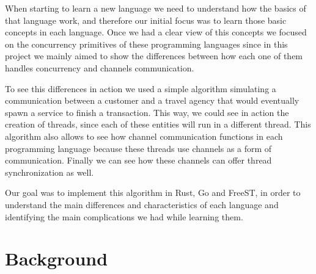 \documentclass[runningheads]{llncs}
\begin{document}
When starting to learn a new language we need to understand how the basics of that language work, and therefore our initial focus was to learn those basic concepts in each language. Once we had a clear view of this concepts we focused on the concurrency primitives of these programming languages since in this project we mainly aimed to show the differences between how each one of them handles concurrency and channels communication.

To see this differences in action we used a simple algorithm simulating a communication between a customer and a travel agency that would eventually spawn a service to finish a transaction. This way, we could see in action the creation of threads, since each of these entities will run in a different thread. This algorithm also allows to see how channel communication functions in each programming language because these threads use channels as a form of communication. Finally we can see how these channels can offer thread synchronization as well.

Our goal was to implement this algorithm in Rust, Go and FreeST, in order to understand the main differences and characteristics of each language and identifying the main complications we had while learning them.
\section{Background}
\end{document}
